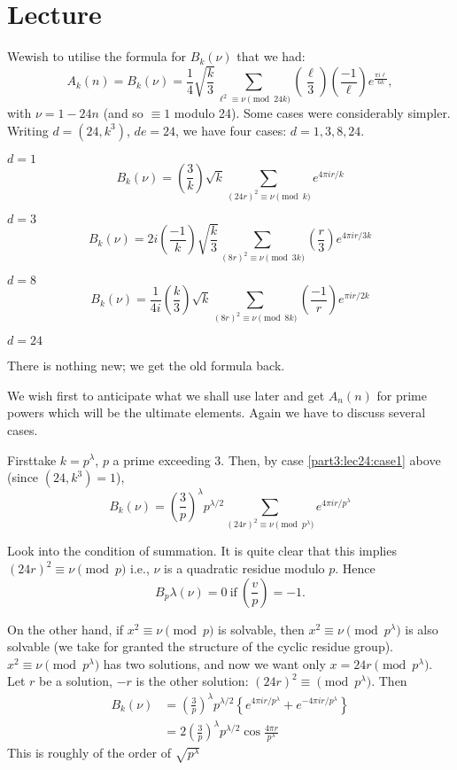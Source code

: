 \chapter{Lecture}\label{part3:lec25} %

We\pageoriginale wish to utilise the formula for $B_k (\nu)$ that we
had: 
$$
A_k (n) = B_k (\nu) = \frac{1}{4} \sqrt{\frac{k}{3}} \sum_{\ell^2
  \equiv \nu \pmod{24k}} \left(\frac{\ell}{3} \right)
  \left(\frac{-1}{\ell} \right) e^{\frac{\pi i \ell}{6k}}, 
$$
with $\nu=1-24n$ (and so $\equiv 1$ modulo 24). Some cases were
considerably simpler. Writing $d= (24, k^3)$, $de =24$, we have four
cases: $d=1, 3, 8, 24$.

\medskip
\noindent $d=1$
$$
B_k (\nu) = \left(\frac{3}{k} \right) \sqrt{k} \sum_{(24 r)^2\equiv
  \nu \pmod{k}} e^{4 \pi i r/k}
$$

\noindent $d=3$
$$
B_k (\nu) = 2i \left(\frac{-1}{k} \right) \sqrt{\frac{k}{3}} \sum_{(8 r)^2\equiv
  \nu \pmod{3k}} \left(\frac{r}{3} \right) e^{4 \pi i r/3k}
$$

\noindent $d=8$
$$
B_k (\nu) = \frac{1}{4i} \left(\frac{k}{3} \right) \sqrt{k} \sum_{(8 r)^2\equiv
  \nu \pmod{8k}} \left(\frac{-1}{r} \right) e^{\pi i r/2k}
$$

\noindent $d=24$

There is nothing new; we get the old formula back. 

We wish first to anticipate what we shall use later and get $A_n(n)$
for prime powers which will be the ultimate elements. Again we have to
discuss several cases.

First\pageoriginale take $k=p^\lambda$, $p$ a prime exceeding
3. Then, by case \ref{part3:lec24:case1} above (since $(24, k^3)=1$),
$$
B_k (\nu) = \left(\frac{3}{p} \right)^\lambda p^{\lambda/2}
\sum_{(24r)^2 \equiv \nu \pmod{p^\lambda}} e^{4 \pi i r/p^\lambda}
$$

Look into the condition of summation. It is quite clear that this
implies $(24 r)^2 \equiv \nu \pmod{p}$ i.e., $\nu$ is a quadratic
residue modulo $p$. Hence
\begin{equation*}
  B_p \lambda (\nu) =0 ~\text{if}~ \left(\frac{v}{p} \right)=-
  1. \tag{1}\label{part3:lec25:eq1} 
\end{equation*}

On the other hand, if $x^2 \equiv \nu \pmod{p}$ is solvable, then $x^2
\equiv \nu \pmod{p^\lambda}$ is also solvable (we take for granted the
structure of the cyclic residue group). $x^2 \equiv \nu
\pmod{p^\lambda}$ has two solutions, and now we want only $x= 24r
\pmod{p^\lambda}$. Let $r$ be a solution, $-r$ is the other solution:
$(24r)^2 \equiv  \pmod{p^\lambda}$. Then  
\begin{align*}
  B_k (\nu) & = \left(\frac{3}{p} \right)^\lambda p^{\lambda/2}
  \left\{ e^{4 \pi i r/p^\lambda} + e^{-4 \pi i r/p^\lambda}\right\}\\
  & = 2 \left(\frac{3}{p} \right)^\lambda p^{\lambda/2} \cos \frac{4
    \pi r}{p^\lambda}\tag{2}\label{part3:lec25:eq2} 
\end{align*}
This is roughly of the order of $\sqrt{p^\lambda}$


